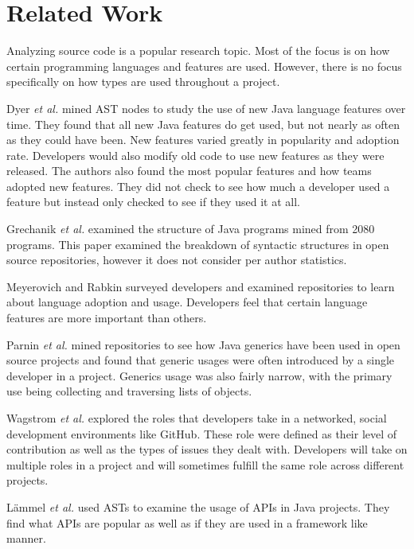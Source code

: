 \section{Related Work}

Analyzing source code is a popular research topic. Most of the focus is on how certain programming languages and features are used. However, there is no focus specifically on how types are used throughout a project.

Dyer \textit{et al.} \cite{Dyer:2014:MBA:2568225.2568295} mined AST nodes to study the use of new Java language features over time. They found that all new Java features do get used, but not nearly as often as they could have been. New features varied greatly in popularity and adoption rate. Developers would also modify old code to use new features as they were released. The authors also found the most popular features and how teams adopted new features. They did not check to see how much a developer used a feature but instead only checked to see if they used it at all.

Grechanik \textit{et al.} \cite{Grechanik:2010:EIL:1852786.1852801} examined the structure of Java programs mined from 2080 programs. This paper examined the breakdown of syntactic structures in open source repositories, however it does not consider per author statistics. 

Meyerovich and Rabkin \cite{Meyerovich:2013:EAP:2509136.2509515} surveyed developers and examined repositories to learn about language adoption and usage. Developers feel that certain language features are more important than others.

Parnin \textit{et al.} \cite{Parnin:2011:JGA:1985441.1985446} mined repositories to see how Java generics have been used in open source projects and found that generic usages were often introduced by a single developer in a project. Generics usage was also fairly narrow, with the primary use being collecting and traversing lists of objects.

Wagstrom \textit{et al.} \cite{Patrick:Wagstrom:2012} explored the roles that developers take in a networked, social development environments like GitHub. These role were defined as their level of contribution as well as the types of issues they dealt with. Developers will take on multiple roles in a project and will sometimes fulfill the same role across different projects.

L\"{a}mmel \textit{et al.} \cite{Lammel:2011:LAA:1982185.1982471} used ASTs to examine the usage of APIs in Java projects. They find what APIs are popular as well as if they are used in a framework like manner.

